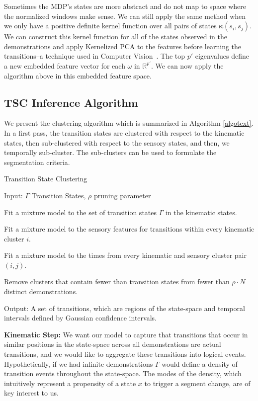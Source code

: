 Sometimes the MDP's states are more abstract and do not map to space where the normalized windows make sense.
We can still apply the same method when we only have a positive definite kernel function over all pairs of states $\mathbf{\kappa}(s_i,s_j)$.
We can construct this kernel function for all of the states observed in the demonstrations and apply Kernelized PCA to the features before learning the transitions--a technique used in Computer Vision~\cite{DBLP:conf/nips/MikaSSMSR98}.
The top $p'$ eigenvalues define a new embedded feature vector for each $\omega$ in $\mathbb{R}^{p'}$.
We can now apply the algorithm above in this embedded feature space.


\subsection*{TSC Inference Algorithm}
We present the clustering algorithm which is summarized in Algorithm \ref{algotext}.
In a first pass, the transition states are clustered with respect to the kinematic states, then sub-clustered with respect to the sensory states, and then, we temporally sub-cluster.
The sub-clusters can be used to formulate the segmentation criteria.

\begin{algorithm}[t]
\caption{Transition State Clustering \label{algotext}}
\begin{algorithmic}
\State \textsf{Input: } $\Gamma$ Transition States, $\rho$ pruning parameter

\State Fit a mixture model to the set of transition states $\Gamma$ in the kinematic states.

\State Fit a mixture model to the sensory features for transitions within every kinematic cluster $i$.

\State Fit a mixture model to the times from every kinematic and sensory cluster pair $(i,j)$.

\State Remove clusters that contain fewer than transition states from fewer than $\rho \cdot N$ distinct demonstrations.

\State \textsf{Output: } A set of transitions, which are regions of the state-space and temporal intervals defined by Gaussian confidence intervals.

\end{algorithmic}

\end{algorithm}

\vspace{0.5em}\noindent\textbf{Kinematic Step: } We want our model to capture that transitions that occur in similar positions in the state-space across all demonstrations are actual transitions, and we would like to aggregate these transitions into logical events. 
Hypothetically, if we had infinite demonstrations $\Gamma$ would define a density of transition events throughout the state-space.
The modes of the density, which intuitively represent a propensity of a state $x$ to trigger a segment change, are of key interest to us. 

